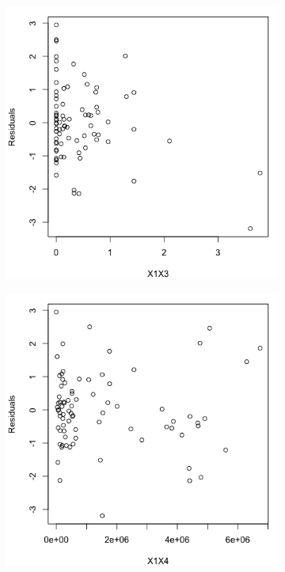 \documentclass[10pt]{report}
\begin{document}
\begin{enumerate}
\begin{figure}[H]
\begin{subfigure}[b]{.25\linewidth}
		\end{subfigure}%
		\begin{subfigure}[b]{.25\linewidth}
			\includegraphics[width=\linewidth]{p2/18e_x1x3.png} 
		\end{subfigure}%
		\begin{subfigure}[b]{.25\linewidth}
			\includegraphics[width=\linewidth]{p2/18e_x1x4.png} 

\end{subfigure}
\end{figure}
\end{enumerate}
\end{document}
